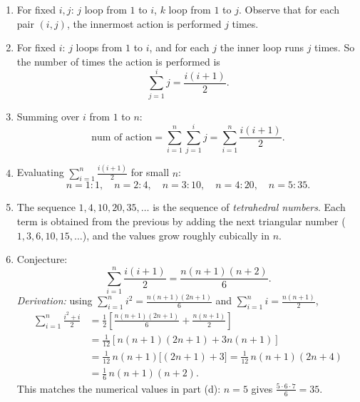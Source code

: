 \documentclass[11pt]{article}
\begin{document}
\begin{solution}
    \begin{enumerate}[label=(\alph*)]
    \item For fixed $i,j$: $j$ loop from $1$ to $i$, $k$ loop from $1$ to
        $j$. Observe that for each pair $(i,j)$, the innermost action is
        performed $j$ times.

    \item For fixed $i$: $j$ loops from $1$ to $i$, and for each $j$ the
        inner loop runs $j$ times. So the number of times the action is
        performed is
        \[
            \sum_{j=1}^{i} j = \frac{i(i+1)}{2}.
        \]

    \item Summing over $i$ from $1$ to $n$:
        \[
            \text{num of action} = \sum_{i=1}^{n}\sum_{j=1}^{i} j
            = \sum_{i=1}^{n} \frac{i(i+1)}{2}.
        \]

    \item Evaluating $\displaystyle\sum_{i=1}^{n}\frac{i(i+1)}{2}$ for
        small $n$:
        \[
            n=1: 1, \quad n=2: 4, \quad n=3: 10, \quad n=4: 20, \quad
            n=5: 35.
        \]

    \item The sequence $1,4,10,20,35,\dots$ is the sequence of
        \emph{tetrahedral numbers}. Each term is obtained from the
        previous by adding the next triangular number
        ($1,3,6,10,15,\dots$), and the values grow roughly cubically in
        $n$.

    \item Conjecture:
        \[
            \sum_{i=1}^{n}\frac{i(i+1)}{2} = \frac{n(n+1)(n+2)}{6}.
        \]
        \emph{Derivation:} using $\displaystyle\sum_{i=1}^n i^2 =
        \frac{n(n+1)(2n+1)}{6}$ and $\displaystyle\sum_{i=1}^n i =
        \frac{n(n+1)}{2}$,
        \begin{align*}
            \sum_{i=1}^n \frac{i^2+i}{2}
            &= \frac12\left[\frac{n(n+1)(2n+1)}{6}
                + \frac{n(n+1)}{2}\right] \\
            &= \frac{1}{12}\left[n(n+1)(2n+1) + 3n(n+1)\right] \\
            &= \frac{1}{12}\,n(n+1)\big[(2n+1)+3\big]
                = \frac{1}{12}\,n(n+1)(2n+4) \\
            &= \frac{1}{6}\,n(n+1)(n+2).
        \end{align*}
        This matches the numerical values in part (d): $n=5$ gives
        $\frac{5\cdot6\cdot7}{6}=35$.\ \checkmark


\end{enumerate}
\end{solution}
\end{document}
